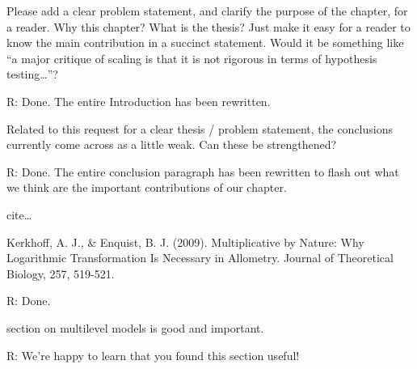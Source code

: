 Please add a clear problem statement, and clarify the purpose of the chapter, for a reader. Why this chapter?  What is the thesis? Just make it easy for a reader to know the main contribution in a succinct statement. Would it be something like “a major critique of scaling is that it is not rigorous in terms of hypothesis testing…”?

R: Done. The entire Introduction has been rewritten.

Related to this request for a clear thesis / problem statement, the conclusions currently come across as a little weak. Can these be strengthened?

R: Done. The entire conclusion paragraph has been rewritten to flash out what we think are the important contributions of our chapter.

cite… 

Kerkhoff, A. J., & Enquist, B. J. (2009). Multiplicative by Nature: Why Logarithmic Transformation Is Necessary in Allometry. Journal of Theoretical Biology, 257, 519-521.

R: Done.

section on multilevel models is good and important.  

R: We're happy to learn that you found this section useful!

